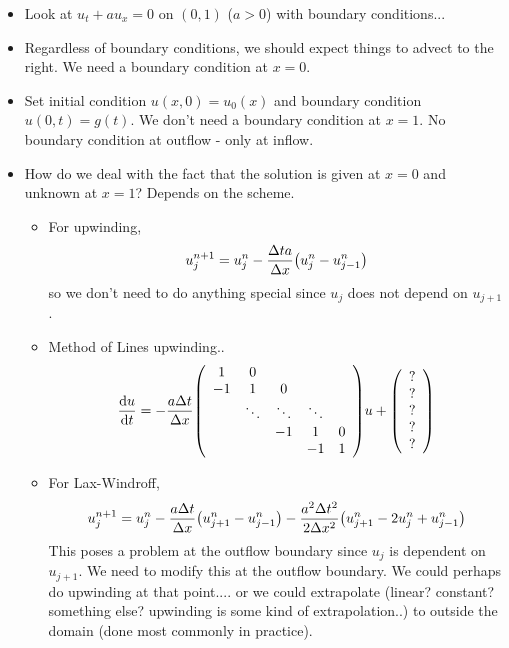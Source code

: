 \documentclass{article}
\newcommand{\Dx}{\Delta x}
\newcommand{\Dt}{\Delta t}
\newcommand{\tridsym}[3]{
    \qty(\begin{array}{ccccc}
                    #1 & #2 & & & \\
                    #3 & #1 & #2 & & \\
                    & \ddots & \ddots & \ddots &  \\
                    & & #3 & #1 & #2 \\
                    & & & #3 & #1
                \end{array})
}
\begin{document}
        \begin{itemize}
            \item Look at $u_t + au_x = 0$ on $(0,1)$ ($a > 0$) with boundary conditions...
            \item Regardless of boundary conditions, we should expect things to advect to the right.  We need a boundary condition at $x = 0$.
            \item Set initial condition $u(x,0) = u_0(x)$ and boundary condition $u(0,t) = g(t)$.  We don't need a boundary condition at $x = 1$.  No boundary condition at outflow - only at inflow.
            \item How do we deal with the fact that the solution is given at $x = 0$ and unknown at $x = 1$?  Depends on the scheme.
            \begin{itemize}
                \item For upwinding,
                \begin{align*}
                    u_j^{n+1} = u_j^n - \frac{\Dt a}{\Dx}\qty(u_j^n - u_{j-1}^n)
                \end{align*}
                so we don't need to do anything special since $u_j$ does not depend on $u_{j+1}$.
                \item Method of Lines upwinding..
                \begin{align*}
                    \frac{\dd u}{\dd t} = -\frac{a\Dt}{\Dx}\tridsym{1}{0}{-1}u + \qty(\begin{array}{c}
                        ? \\ ? \\ ? \\ ? \\ ?
                    \end{array})
                \end{align*}
                \item For Lax-Windroff,
                \begin{align*}
                    u_j^{n+1} = u_j^n - \frac{a\Dt}{\Dx}\qty(u_{j+1}^n - u_{j-1}^n) - \frac{a^2\Dt^2}{2\Dx^2}\qty(u_{j+1}^n - 2u_j^n + u_{j-1}^n)
                \end{align*}
                This poses a problem at the outflow boundary since $u_j$ is dependent on $u_{j+1}$.  We need to modify this at the outflow boundary.  We could perhaps do upwinding at that point.... or we could extrapolate (linear? constant? something else? upwinding is some kind of extrapolation..) to outside the domain (done most commonly in practice).
            \end{itemize}
        \end{itemize}
\end{document}
